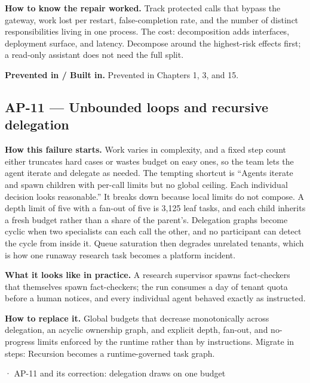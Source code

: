 \textbf{How to know the repair worked.} Track protected calls that bypass the gateway, work lost per restart, false-completion rate, and the number of distinct responsibilities living in one process. The cost: decomposition adds interfaces, deployment surface, and latency. Decompose around the highest-risk effects first; a read-only assistant does not need the full split.\par

\textbf{Prevented in / Built in.} Prevented in Chapters 1, 3, and 15.\par

\subsection{AP-11 — Unbounded loops and recursive delegation}

\textbf{How this failure starts.} Work varies in complexity, and a fixed step count either truncates hard cases or wastes budget on easy ones, so the team lets the agent iterate and delegate as needed. The tempting shortcut is “Agents iterate and spawn children with per-call limits but no global ceiling. Each individual decision looks reasonable.” It breaks down because local limits do not compose. A depth limit of five with a fan-out of five is 3,125 leaf tasks, and each child inherits a fresh budget rather than a share of the parent's. Delegation graphs become cyclic when two specialists can each call the other, and no participant can detect the cycle from inside it. Queue saturation then degrades unrelated tenants, which is how one runaway research task becomes a platform incident.\par

\textbf{What it looks like in practice.} A research supervisor spawns fact-checkers that themselves spawn fact-checkers; the run consumes a day of tenant quota before a human notices, and every individual agent behaved exactly as instructed.\par

\textbf{How to replace it.} Global budgets that decrease monotonically across delegation, an acyclic ownership graph, and explicit depth, fan-out, and no-progress limits enforced by the runtime rather than by instructions. Migrate in steps: Recursion becomes a runtime-governed task graph.\par

\BookSnake · AP-11 and its correction: delegation draws on one budget\par

